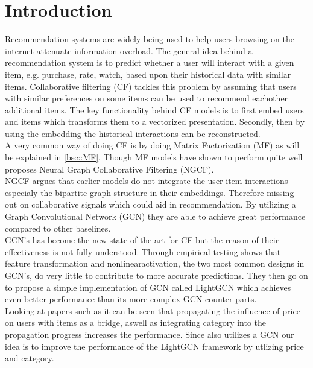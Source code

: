 \section{Introduction}
Recommendation systems are widely being used to help users browsing on the internet attenuate information overload\cite{YT_rec,Pint_rec}.
The general idea behind a recommendation system is to predict whether a user will interact with a given item, e.g. purchase, rate, watch, based upon their historical data with similar items.
Collaborative filtering (CF) tackles this problem by assuming that users with similar preferences on some items can be used to recommend eachother additional items.
The key functionality behind CF models is to first embed users and items which transforms them to a vectorized presentation.
Secondly, then by using the embedding the historical interactions can be reconstructed.
\\
A very common way of doing CF is by doing Matrix Factorization (MF) as will be explained in \autoref{bsc::MF}.
Though MF models have shown to perform quite well \cite{NGCF_2019} proposes Neural Graph Collaborative Filtering (NGCF).
\\ 
NGCF argues that earlier models do not integrate the user-item interactions especialy the bipartite graph structure in their embeddings.
Therefore missing out on collaborative signals which could aid in recommendation.
By utilizing a Graph Convolutional Network (GCN) they are able to achieve great performance compared to other baselines.
\\
GCN's has become the new state-of-the-art for CF but the reason of their effectiveness is not fully understood\cite{lightgcn}.
Through empirical testing \cite{lightgcn} shows that feature transformation and nonlinearactivation, the two most common designs in GCN's, do very little to contribute to more accurate predictions.
They then go on to propose a simple implementation of GCN called LightGCN which achieves even better performance than its more complex GCN counter parts.
\\
Looking at papers such as \cite{Priceaware} it can be seen that propagating the influence of price on users with items as a bridge, aswell as integrating category into the propagation progress increases the performance.
Since \cite{Priceaware} also utilizes a GCN our idea is to improve the performance of the LightGCN framework by utlizing price and category.